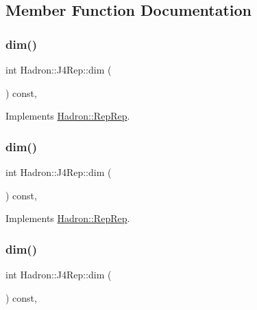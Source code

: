 \subsection{Member Function Documentation}
\mbox{\label{structHadron_1_1J4Rep_abd7390e1c86d4543ad991a7167f46615}} 
\subsubsection{\texorpdfstring{dim()}{dim()}\hspace{0.1cm}{\footnotesize\ttfamily [1/5]}}
{\footnotesize\ttfamily int Hadron\+::\+J4\+Rep\+::dim (\begin{DoxyParamCaption}{ }\end{DoxyParamCaption}) const\hspace{0.3cm}{\ttfamily [inline]}, {\ttfamily [virtual]}}



Implements \mbox{\hyperlink{structHadron_1_1RepRep_a92c8802e5ed7afd7da43ccfd5b7cd92b}{Hadron\+::\+Rep\+Rep}}.

\mbox{\label{structHadron_1_1J4Rep_abd7390e1c86d4543ad991a7167f46615}} 
\subsubsection{\texorpdfstring{dim()}{dim()}\hspace{0.1cm}{\footnotesize\ttfamily [2/5]}}
{\footnotesize\ttfamily int Hadron\+::\+J4\+Rep\+::dim (\begin{DoxyParamCaption}{ }\end{DoxyParamCaption}) const\hspace{0.3cm}{\ttfamily [inline]}, {\ttfamily [virtual]}}



Implements \mbox{\hyperlink{structHadron_1_1RepRep_a92c8802e5ed7afd7da43ccfd5b7cd92b}{Hadron\+::\+Rep\+Rep}}.

\mbox{\label{structHadron_1_1J4Rep_abd7390e1c86d4543ad991a7167f46615}} 
\subsubsection{\texorpdfstring{dim()}{dim()}\hspace{0.1cm}{\footnotesize\ttfamily [3/5]}}
{\footnotesize\ttfamily int Hadron\+::\+J4\+Rep\+::dim (\begin{DoxyParamCaption}{ }\end{DoxyParamCaption}) const\hspace{0.3cm}{\ttfamily [inline]}, {\ttfamily [virtual]}}



